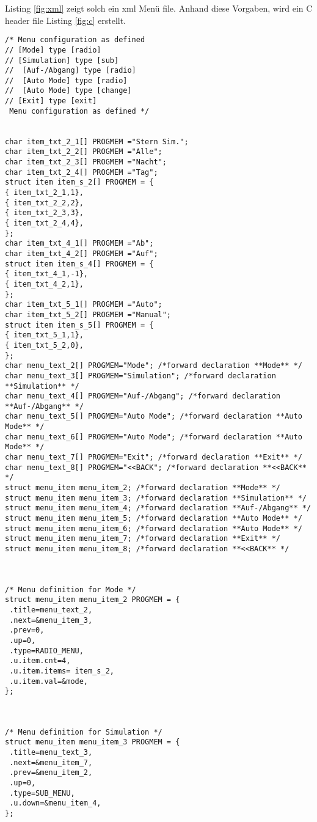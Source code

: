 \documentclass[a4paper]{article}
\begin{document}
Listing \ref{fig:xml} zeigt solch ein xml Men\"u file. Anhand diese Vorgaben, wird ein C header file Listing \ref{fig:c} erstellt.
\begin{tiny}
\begin{lstlisting}[label=fig:c,caption={}]
/* Menu configuration as defined 
// [Mode] type [radio]
// [Simulation] type [sub]
//  [Auf-/Abgang] type [radio]
//  [Auto Mode] type [radio]
//  [Auto Mode] type [change]
// [Exit] type [exit]
 Menu configuration as defined */


char item_txt_2_1[] PROGMEM ="Stern Sim.";
char item_txt_2_2[] PROGMEM ="Alle";
char item_txt_2_3[] PROGMEM ="Nacht";
char item_txt_2_4[] PROGMEM ="Tag";
struct item item_s_2[] PROGMEM = { 
{ item_txt_2_1,1},
{ item_txt_2_2,2},
{ item_txt_2_3,3},
{ item_txt_2_4,4},
};
char item_txt_4_1[] PROGMEM ="Ab";
char item_txt_4_2[] PROGMEM ="Auf";
struct item item_s_4[] PROGMEM = { 
{ item_txt_4_1,-1},
{ item_txt_4_2,1},
};
char item_txt_5_1[] PROGMEM ="Auto";
char item_txt_5_2[] PROGMEM ="Manual";
struct item item_s_5[] PROGMEM = { 
{ item_txt_5_1,1},
{ item_txt_5_2,0},
};
char menu_text_2[] PROGMEM="Mode"; /*forward declaration **Mode** */ 
char menu_text_3[] PROGMEM="Simulation"; /*forward declaration **Simulation** */ 
char menu_text_4[] PROGMEM="Auf-/Abgang"; /*forward declaration **Auf-/Abgang** */ 
char menu_text_5[] PROGMEM="Auto Mode"; /*forward declaration **Auto Mode** */ 
char menu_text_6[] PROGMEM="Auto Mode"; /*forward declaration **Auto Mode** */ 
char menu_text_7[] PROGMEM="Exit"; /*forward declaration **Exit** */ 
char menu_text_8[] PROGMEM="<<BACK"; /*forward declaration **<<BACK** */ 
struct menu_item menu_item_2; /*forward declaration **Mode** */ 
struct menu_item menu_item_3; /*forward declaration **Simulation** */ 
struct menu_item menu_item_4; /*forward declaration **Auf-/Abgang** */ 
struct menu_item menu_item_5; /*forward declaration **Auto Mode** */ 
struct menu_item menu_item_6; /*forward declaration **Auto Mode** */ 
struct menu_item menu_item_7; /*forward declaration **Exit** */ 
struct menu_item menu_item_8; /*forward declaration **<<BACK** */ 



/* Menu definition for Mode */
struct menu_item menu_item_2 PROGMEM = {
 .title=menu_text_2,
 .next=&menu_item_3,
 .prev=0,
 .up=0,
 .type=RADIO_MENU,
 .u.item.cnt=4,
 .u.item.items= item_s_2,
 .u.item.val=&mode,
};



/* Menu definition for Simulation */
struct menu_item menu_item_3 PROGMEM = {
 .title=menu_text_3,
 .next=&menu_item_7,
 .prev=&menu_item_2,
 .up=0,
 .type=SUB_MENU,
 .u.down=&menu_item_4,
};




\end{lstlisting}
\end{tiny}
\end{document}
